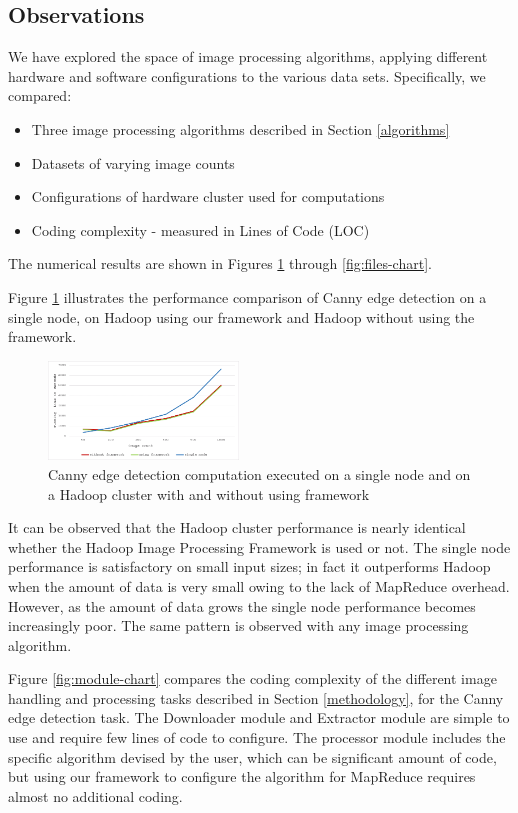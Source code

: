 \documentclass[conference]{IEEEtran}
\begin{document}
\subsection{Observations}   

We have explored the space of image processing algorithms, applying
different hardware and software configurations to the various data
sets.  Specifically, we compared:

\begin{itemize}
\item Three image processing algorithms described in Section
  \ref{algorithms}
\item Datasets of varying image counts
\item Configurations of hardware cluster used for computations 
\item Coding complexity - measured in Lines of Code (LOC)
\end{itemize}

The numerical results are shown in Figures \ref{fig:perf-chart}
through \ref{fig:files-chart}.

Figure \ref{fig:perf-chart} illustrates the performance comparison of
Canny edge detection on a single node, on Hadoop using our framework
and Hadoop without using the framework.

\begin{figure}[h]
  \centering
  \includegraphics[width=0.45\textwidth]{perf-graph}
  \caption{Canny edge detection computation executed on a single node
    and on a Hadoop cluster with and without using framework}
  \label{fig:perf-chart}
\end{figure}

It can be observed that the Hadoop cluster performance is nearly
identical whether the Hadoop Image Processing Framework is used or
not.  The single node performance is satisfactory on small input
sizes; in fact it outperforms Hadoop when the amount of data is very
small owing to the lack of MapReduce overhead.  However, as the amount
of data grows the single node performance becomes increasingly poor.
The same pattern is observed with any image processing algorithm.

Figure \ref{fig:module-chart} compares the coding complexity of the
different image handling and processing tasks described in Section
\ref{methodology}, for the Canny edge detection task. The Downloader
module and Extractor module are simple to use and require few lines of
code to configure. The processor module includes the specific
algorithm devised by the user, which can be significant amount of
code, but using our framework to configure the algorithm for MapReduce
requires almost no additional coding.
\end{document}
